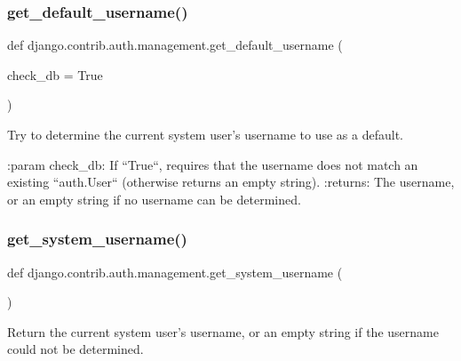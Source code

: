 \subsubsection{\texorpdfstring{get\+\_\+default\+\_\+username()}{get\_default\_username()}}
{\footnotesize\ttfamily def django.\+contrib.\+auth.\+management.\+get\+\_\+default\+\_\+username (\begin{DoxyParamCaption}\item[{}]{check\+\_\+db = {\ttfamily True} }\end{DoxyParamCaption})}

\begin{DoxyVerb}Try to determine the current system user's username to use as a default.

:param check_db: If ``True``, requires that the username does not match an
    existing ``auth.User`` (otherwise returns an empty string).
:returns: The username, or an empty string if no username can be
    determined.
\end{DoxyVerb}
 \mbox{\label{namespacedjango_1_1contrib_1_1auth_1_1management_aada845bc6eed9154c36549c10b357c28}} 
\subsubsection{\texorpdfstring{get\+\_\+system\+\_\+username()}{get\_system\_username()}}
{\footnotesize\ttfamily def django.\+contrib.\+auth.\+management.\+get\+\_\+system\+\_\+username (\begin{DoxyParamCaption}{ }\end{DoxyParamCaption})}

\begin{DoxyVerb}Return the current system user's username, or an empty string if the
username could not be determined.
\end{DoxyVerb}
 